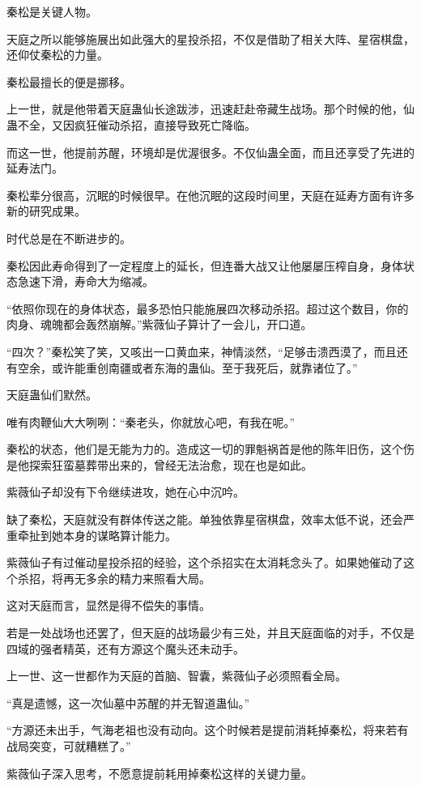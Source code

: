 \begin{this_body}
秦松是关键人物。

天庭之所以能够施展出如此强大的星投杀招，不仅是借助了相关大阵、星宿棋盘，还仰仗秦松的力量。

秦松最擅长的便是挪移。

上一世，就是他带着天庭蛊仙长途跋涉，迅速赶赴帝藏生战场。那个时候的他，仙蛊不全，又因疯狂催动杀招，直接导致死亡降临。

而这一世，他提前苏醒，环境却是优渥很多。不仅仙蛊全面，而且还享受了先进的延寿法门。

秦松辈分很高，沉眠的时候很早。在他沉眠的这段时间里，天庭在延寿方面有许多新的研究成果。

时代总是在不断进步的。

秦松因此寿命得到了一定程度上的延长，但连番大战又让他屡屡压榨自身，身体状态急速下滑，寿命大为缩减。

“依照你现在的身体状态，最多恐怕只能施展四次移动杀招。超过这个数目，你的肉身、魂魄都会轰然崩解。”紫薇仙子算计了一会儿，开口道。

“四次？”秦松笑了笑，又咳出一口黄血来，神情淡然，“足够击溃西漠了，而且还有空余，或许能重创南疆或者东海的蛊仙。至于我死后，就靠诸位了。”

天庭蛊仙们默然。

唯有肉鞭仙大大咧咧：“秦老头，你就放心吧，有我在呢。”

秦松的状态，他们是无能为力的。造成这一切的罪魁祸首是他的陈年旧伤，这个伤是他探索狂蛮墓葬带出来的，曾经无法治愈，现在也是如此。

紫薇仙子却没有下令继续进攻，她在心中沉吟。

缺了秦松，天庭就没有群体传送之能。单独依靠星宿棋盘，效率太低不说，还会严重牵扯到她本身的谋略算计能力。

紫薇仙子有过催动星投杀招的经验，这个杀招实在太消耗念头了。如果她催动了这个杀招，将再无多余的精力来照看大局。

这对天庭而言，显然是得不偿失的事情。

若是一处战场也还罢了，但天庭的战场最少有三处，并且天庭面临的对手，不仅是四域的强者精英，还有方源这个魔头还未动手。

上一世、这一世都作为天庭的首脑、智囊，紫薇仙子必须照看全局。

“真是遗憾，这一次仙墓中苏醒的并无智道蛊仙。”

“方源还未出手，气海老祖也没有动向。这个时候若是提前消耗掉秦松，将来若有战局突变，可就糟糕了。”

紫薇仙子深入思考，不愿意提前耗用掉秦松这样的关键力量。


\end{this_body}
